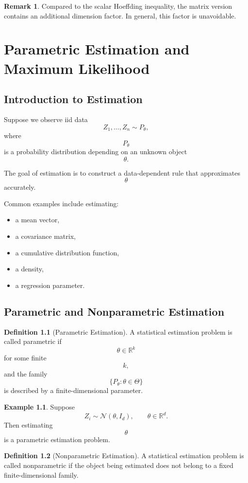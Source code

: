 \documentclass[12pt,oneside]{book}
\numberwithin{equation}{section}
\theoremstyle{definition}
\newtheorem{definition}{Definition}[section]
\newtheorem{example}{Example}[section]
\newtheorem{remark}{Remark}[section]
\theoremstyle{plain}
\theoremstyle{remark}
\newcommand{\R}{\mathbb{R}}
\newcommand{\Normal}{\mathcal{N}}
\begin{document}
\begin{remark}
Compared to the scalar Hoeffding inequality, the matrix version contains an additional dimension factor. In general, this factor is unavoidable.
\end{remark}

\chapter{Parametric Estimation and Maximum Likelihood}

\section{Introduction to Estimation}

Suppose we observe iid data
\[
Z_1,\dots,Z_n\sim P_\theta,
\]
where
\[
P_\theta
\]
is a probability distribution depending on an unknown object
\[
\theta.
\]

The goal of estimation is to construct a data-dependent rule that approximates
\[
\theta
\]
accurately.

Common examples include estimating:
\begin{itemize}
\item a mean vector,
\item a covariance matrix,
\item a cumulative distribution function,
\item a density,
\item a regression parameter.
\end{itemize}

\section{Parametric and Nonparametric Estimation}

\begin{definition}[Parametric Estimation]
A statistical estimation problem is called parametric if
\[
\theta\in\R^k
\]
for some finite
\[
k,
\]
and the family
\[
\{P_\theta:\theta\in\Theta\}
\]
is described by a finite-dimensional parameter.
\end{definition}

\begin{example}
Suppose
\[
Z_i\sim \Normal(\theta,I_d),
\qquad
\theta\in\R^d.
\]
Then estimating
\[
\theta
\]
is a parametric estimation problem.
\end{example}

\begin{definition}[Nonparametric Estimation]
A statistical estimation problem is called nonparametric if the object being estimated does not belong to a fixed finite-dimensional family.
\end{definition}
\end{document}
